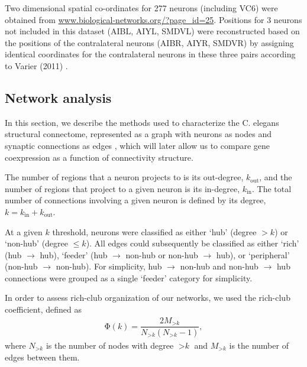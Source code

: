 \documentclass[10pt,letterpaper]{article}
\begin{document}
Two dimensional spatial co-ordinates for 277 neurons (including VC6) were obtained from \url{www.biological-networks.org/?page_id=25}.
Positions for 3 neurons not included in this dataset (AIBL, AIYL, SMDVL) were reconstructed based on the positions of the contralateral neurons (AIBR, AIYR, SMDVR) by assigning identical coordinates for the contralateral neurons in these three pairs according to Varier (2011) \cite{Varier2011}.


\subsection*{Network analysis}

In this section, we describe the methods used to characterize the C. elegans structural connectome, represented as a graph with neurons as nodes and synaptic connections as edges \cite{Schroter:2017eo}, which will later allow us to compare gene coexpression as a function of connectivity structure.

The number of regions that a neuron projects to is its out-degree, $k_\mathrm{out}$, and the number of regions that project to a given neuron is its in-degree, $k_\mathrm{in}$.
The total number of connections involving a given neuron is defined by its degree, $k = k_\mathrm{in} + k_\mathrm{out}$.

At a given $k$ threshold, neurons were classified as either `hub' (degree $>k$) or `non-hub' (degree $\leq k$).
All edges could subsequently be classified as either `rich' (hub $\rightarrow$ hub), `feeder' (hub $\rightarrow$ non-hub or non-hub $\rightarrow$ hub), or `peripheral' (non-hub $\rightarrow$ non-hub).
For simplicity, hub $\rightarrow$ non-hub and non-hub $\rightarrow$ hub connections were grouped as a single `feeder' category for simplicity.

In order to assess rich-club organization of our networks, we used the rich-club coefficient, defined as
\begin{eqnarray} \label{eq:RCcoef}
    \mathrm{\Phi(\textit{k})} = \dfrac{2M_{>\textit{k}}}{N_{>\textit{k}}(N_{>\textit{k}}-1)},
\end{eqnarray}
where $N_{>\textit{k}}$ is the number of nodes with degree $>\textit{k}$ and $M_{>\textit{k}}$ is the number of edges between them.
\end{document}

